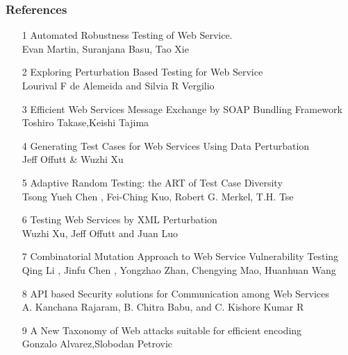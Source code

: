 \documentclass[10pt]{beamer}
\begin{document}
\begin{frame}[t,allowframebreaks]
	\frametitle{References}
	\begin{enumerate}
		\item [1] Automated Robustness Testing of Web Service.\\
		Evan Martin, Suranjana Basu, Tao Xie
		\item [2] Exploring Perturbation Based Testing for Web Service \\
		Lourival F de Alemeida and Silvia R Vergilio
		\item [3] Efficient Web Services Message Exchange by SOAP Bundling Framework\\
		Toshiro Takase,Keishi Tajima
		\item [4] Generating Test Cases for Web Services Using Data Perturbation\\
		Jeff Offutt \& Wuzhi Xu
		\item [5] Adaptive Random Testing: the ART of Test Case Diversity\\
		Tsong Yueh Chen , Fei-Ching Kuo, Robert G. Merkel, T.H. Tse
		\item [6] Testing Web Services by XML Perturbation\\
		Wuzhi Xu, Jeff Offutt and Juan Luo

		\item [7] Combinatorial Mutation Approach to Web Service Vulnerability Testing \\
		Qing Li , Jinfu Chen , Yongzhao Zhan, Chengying Mao, Huanhuan Wang
		\item [8] API based Security solutions for
		Communication among Web Services\\
		A. Kanchana Rajaram, B. Chitra Babu, and C. Kishore Kumar R
		\item [9] A New Taxonomy of Web attacks suitable for efficient encoding\\
		Gonzalo Alvarez,Slobodan Petrovic
	\end{enumerate}
\end{frame}




{\1
\begin{frame}
\end{frame}}
\end{document}
